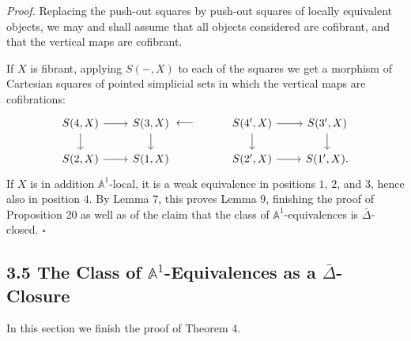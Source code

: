 \documentclass[11pt]{article}
\newcommand{\Aone}{\mathbb A^1}
\theoremstyle{deligne}
\newenvironment{proofdel}{\noindent\textit{Proof.}}{\hfill$\square$}
\begin{document}
\begin{proofdel}
Replacing the push-out squares by push-out squares of locally equivalent objects, we may and shall assume that all objects considered are cofibrant, and that the vertical maps are cofibrant.

If \(X\) is fibrant, applying \(S(-,X)\) to each of the squares we get a morphism of Cartesian squares of pointed simplicial sets in which the vertical maps are cofibrations:
\[
\begin{tikzcd}[column sep=2.2em,row sep=1.5em]
S(4,X) \arrow[r] \arrow[d] & S(3,X) \arrow[d]
&[-0.2em] \arrow[l,phantom,"\longleftarrow"] &[-0.2em]
S(4',X) \arrow[r] \arrow[d] & S(3',X) \arrow[d] \\
S(2,X) \arrow[r] & S(1,X) && S(2',X) \arrow[r] & S(1',X).
\end{tikzcd}
\]
If \(X\) is in addition \(\Aone\)-local, it is a weak equivalence in positions \(1\), \(2\), and \(3\), hence also in position \(4\). By Lemma 7, this proves Lemma 9, finishing the proof of Proposition 20 as well as of the claim that the class of \(\Aone\)-equivalences is \(\bar\Delta\)-closed.
\end{proofdel}

\subsection*{3.5 The Class of \(\Aone\)-Equivalences as a \(\bar\Delta\)-Closure}

In this section we finish the proof of Theorem 4.
\end{document}
